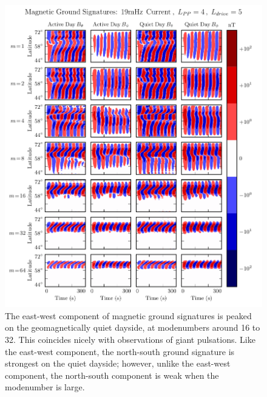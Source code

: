 \begin{figure}[!htb]
    \centering
    \includegraphics[width=\textwidth]{figures/ground_19mHz_day_4_5.pdf}
    \caption[Dayside Ground Magnetic Fields]{
      The east-west component of magnetic ground signatures is peaked on the geomagnetically quiet dayside, at modenumbers around 16 to 32. This coincides nicely with observations of giant pulsations. Like the east-west component, the north-south ground signature is strongest on the quiet dayside; however, unlike the east-west component, the north-south component is weak when the modenumber is large. 
    }
    \label{fig_ground_19mHz_day_4_5}
\end{figure}

